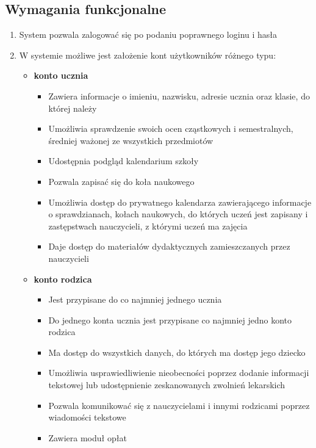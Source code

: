 \documentclass{article}
\begin{document}
\subsection{Wymagania funkcjonalne}
\begin{enumerate}
    \item System pozwala zalogować się po podaniu poprawnego loginu i hasła
    \item W systemie możliwe jest założenie kont użytkowników różnego typu:
    \begin{itemize}
        \item \textbf{konto ucznia}
        \begin{itemize}
            \item Zawiera informacje o imieniu, nazwisku, adresie ucznia oraz klasie, do której należy
            \item Umożliwia sprawdzenie swoich ocen cząstkowych i semestralnych, średniej ważonej ze wszystkich przedmiotów
            \item Udostępnia podgląd kalendarium szkoły
            \item Pozwala zapisać się do koła naukowego
            \item Umożliwia dostęp do prywatnego kalendarza zawierającego informacje o sprawdzianach, kołach naukowych, do których uczeń jest zapisany i zastępstwach nauczycieli, z którymi uczeń ma zajęcia
            \item Daje dostęp do materiałów dydaktycznych zamieszczanych przez nauczycieli
        \end{itemize}
        \item \textbf{konto rodzica} 
        \begin{itemize}
            \item Jest przypisane do co najmniej jednego ucznia
            \item Do jednego konta ucznia jest przypisane co najmniej jedno konto rodzica
            \item Ma dostęp do wszystkich danych, do których ma dostęp jego dziecko
            \item Umożliwia usprawiedliwienie nieobecności poprzez dodanie informacji tekstowej lub udostępnienie zeskanowanych zwolnień lekarskich
            \item Pozwala komunikować się z nauczycielami i innymi rodzicami poprzez wiadomości tekstowe
            \item Zawiera moduł opłat %
        \end{itemize}

\end{itemize}
\end{enumerate}
\end{document}
